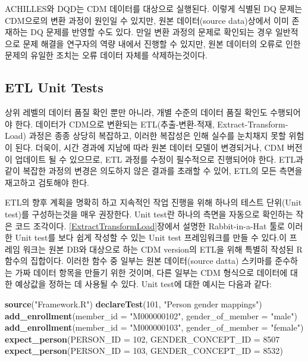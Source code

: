\documentclass[11pt]{book}
\newenvironment{Shaded}{\begin{snugshade}}{\end{snugshade}}
\newcommand{\KeywordTok}[1]{\textcolor[rgb]{0.13,0.29,0.53}{\textbf{#1}}}
\newcommand{\DataTypeTok}[1]{\textcolor[rgb]{0.13,0.29,0.53}{#1}}
\newcommand{\DecValTok}[1]{\textcolor[rgb]{0.00,0.00,0.81}{#1}}
\newcommand{\StringTok}[1]{\textcolor[rgb]{0.31,0.60,0.02}{#1}}
\newcommand{\NormalTok}[1]{#1}
\theoremstyle{definition}
\theoremstyle{definition}
\theoremstyle{definition}
\theoremstyle{remark}
\let\BeginKnitrBlock\begin \let\EndKnitrBlock\end
\begin{document}
\BeginKnitrBlock{rmdimportant}
ACHILLES와 DQD는 CDM 데이터를 대상으로 실행된다. 이렇게 식별된 DQ 문제는
CDM으로의 변환 과정이 원인일 수 있지만, 원본 데이터(source data)상에서
이미 존재하는 DQ 문제를 반영할 수도 있다. 만일 변환 과정의 문제로
확인되는 경우 일반적으로 문제 해결을 연구자의 역량 내에서 진행할 수
있지만, 원본 데이터의 오류로 인한 문제의 유일한 조치는 오류 데이터
자체를 삭제하는것이다.
\EndKnitrBlock{rmdimportant}

\subsection{ETL Unit Tests}\label{etlUnitTests}


상위 레벨의 데이터 품질 확인 뿐만 아니라, 개별 수준의 데이터 품질 확인도
수행되어야 한다. 데이터가 CDM으로 변환되는 ETL(추출-변환-적재,
Extract-Transform-Load) 과정은 종종 상당히 복잡하고, 이러한 복잡성은
인해 실수를 눈치채지 못할 위험이 된다. 더욱이, 시간 경과에 지남에 따라
원본 데이터 모델이 변경되거나, CDM 버전이 업데이트 될 수 있으므로, ETL
과정를 수정이 필수적으로 진행되어야 한다. ETL과 같이 복잡한 과정의
변경은 의도하지 않은 결과를 초래할 수 있어, ETL의 모든 측면을 재고하고
검토해야 한다.

ETL의 향후 계획을 명확히 하고 지속적인 작업 진행을 위해 하나의 테스트
단위(Unit test)를 구성하는것을 매우 권장한다. Unit test란 하나의 측면을
자동으로 확인하는 작은 코드 조각이다. \ref{ExtractTransformLoad}장에서
설명한 Rabbit-in-a-Hat 툴로 이러한 Unit test를 보다 쉽게 작성할 수 있는
Unit test 프레임워크를 만들 수 있다.이 프레임 워크는 원본 DB와 대상으로
하는 CDM version의 ETL을 위해 특별히 작성된 R 함수의 집합이다. 이러한
함수 중 일부는 원본 데이터(source datta) 스키마를 준수하는 가짜 데이터
항목을 만들기 위한 것이며, 다른 일부는 CDM 형식으로 데이터에 대한
예상값을 정하는 데 사용될 수 있다. Unit test에 대한 예시는 다음과 같다:

\begin{Shaded}
\begin{Highlighting}[]
\KeywordTok{source}\NormalTok{(}\StringTok{"Framework.R"}\NormalTok{)}
\KeywordTok{declareTest}\NormalTok{(}\DecValTok{101}\NormalTok{, }\StringTok{"Person gender mappings"}\NormalTok{)}
\KeywordTok{add_enrollment}\NormalTok{(}\DataTypeTok{member_id =} \StringTok{"M000000102"}\NormalTok{, }\DataTypeTok{gender_of_member =} \StringTok{"male"}\NormalTok{)}
\KeywordTok{add_enrollment}\NormalTok{(}\DataTypeTok{member_id =} \StringTok{"M000000103"}\NormalTok{, }\DataTypeTok{gender_of_member =} \StringTok{"female"}\NormalTok{)}
\KeywordTok{expect_person}\NormalTok{(}\DataTypeTok{PERSON_ID =} \DecValTok{102}\NormalTok{, }\DataTypeTok{GENDER_CONCEPT_ID =} \DecValTok{8507}
\KeywordTok{expect_person}\NormalTok{(}\DataTypeTok{PERSON_ID =} \DecValTok{103}\NormalTok{, }\DataTypeTok{GENDER_CONCEPT_ID =} \DecValTok{8532}\NormalTok{)}
\end{Highlighting}
\end{Shaded}
\end{document}

